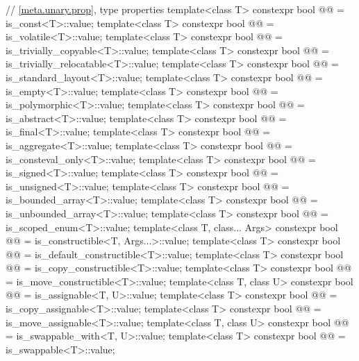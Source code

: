 \begin{codeblock}
{  // \ref{meta.unary.prop}, type properties
  template<class T>
    constexpr bool @@ = is_const<T>::value;
  template<class T>
    constexpr bool @@ = is_volatile<T>::value;
  template<class T>
    constexpr bool @@ = is_trivially_copyable<T>::value;
  template<class T>
    constexpr bool @@ = is_trivially_relocatable<T>::value;
  template<class T>
    constexpr bool @@ = is_standard_layout<T>::value;
  template<class T>
    constexpr bool @@ = is_empty<T>::value;
  template<class T>
    constexpr bool @@ = is_polymorphic<T>::value;
  template<class T>
    constexpr bool @@ = is_abstract<T>::value;
  template<class T>
    constexpr bool @@ = is_final<T>::value;
  template<class T>
    constexpr bool @@ = is_aggregate<T>::value;
template<class T>
    constexpr bool @@ = is_consteval_only<T>::value;
  template<class T>
    constexpr bool @@ = is_signed<T>::value;
  template<class T>
    constexpr bool @@ = is_unsigned<T>::value;
  template<class T>
    constexpr bool @@ = is_bounded_array<T>::value;
  template<class T>
    constexpr bool @@ = is_unbounded_array<T>::value;
  template<class T>
    constexpr bool @@ = is_scoped_enum<T>::value;
  template<class T, class... Args>
    constexpr bool @@ = is_constructible<T, Args...>::value;
  template<class T>
    constexpr bool @@ = is_default_constructible<T>::value;
  template<class T>
    constexpr bool @@ = is_copy_constructible<T>::value;
  template<class T>
    constexpr bool @@ = is_move_constructible<T>::value;
  template<class T, class U>
    constexpr bool @@ = is_assignable<T, U>::value;
  template<class T>
    constexpr bool @@ = is_copy_assignable<T>::value;
  template<class T>
    constexpr bool @@ = is_move_assignable<T>::value;
  template<class T, class U>
    constexpr bool @@ = is_swappable_with<T, U>::value;
  template<class T>
    constexpr bool @@ = is_swappable<T>::value;
}
\end{codeblock}
